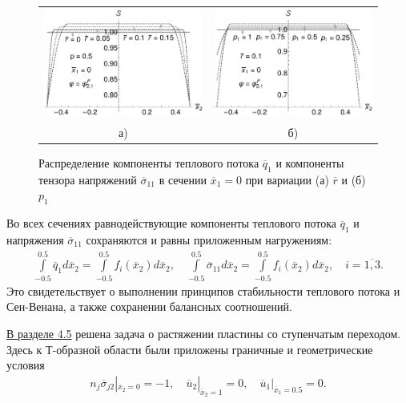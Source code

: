 \begin{figure}[ht] \centering
	\begin{tabular}{cc}
		\includegraphics[width=0.4\linewidth]{pics/HeatFluxStabilityVariationR.pdf} &
		\includegraphics[width=0.4\linewidth]{pics/HeatFluxStabilityVariationP1.pdf} \\
		а) & б)
	\end{tabular}
    \caption{Распределение компоненты теплового потока $\overline{q}_1$ и компоненты тензора напряжений $\overline{\sigma}_{11}$ в сечении $\overline{x}_1 = 0$ при вариации (а) $\overline{r}$ и (б) $p_1$}
    \label{fig:SaintVenantVariation}
\end{figure}

Во всех сечениях равнодействующие компоненты теплового потока $\overline{q}_1$ и напряжения $\overline{\sigma}_{11}$ сохраняются и равны приложенным нагружениям:
\begin{gather*}
	\int\limits_{-0.5}^{0.5} \overline{q}_1 d\overline{x}_2 = 
	\int\limits_{-0.5}^{0.5} f_i (\overline{x}_2) d\overline{x}_2,
	\quad
	\int\limits_{-0.5}^{0.5} \overline{\sigma}_{11} d\overline{x}_2 = 
	\int\limits_{-0.5}^{0.5} f_i (\overline{x}_2) d\overline{x}_2,
	\quad	
	i = \overline{1,3}.
\end{gather*}
Это свидетельствует о выполнении принципов стабильности теплового потока и Сен-Венана, а также сохранении балансных соотношений.

\underline{В разделе 4.5} решена задача о растяжении пластины со ступенчатым переходом. Здесь к Т-образной области были приложены граничные и геометрические условия
\begin{gather*}
	n_j \overline{\sigma}_{j2} |_{\overline{x}_2 = 0} = -1,
	\quad
	\overline{u}_2 |_{\overline{x}_2 = 1} = 0,
	\quad
	\overline{u}_1 |_{\overline{x}_1 = 0.5} = 0.
\end{gather*}

